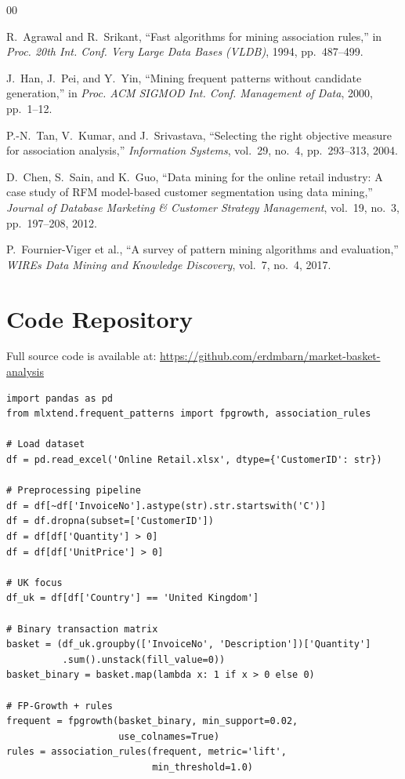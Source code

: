 \documentclass[conference]{IEEEtran}
\begin{document}
\begin{thebibliography}{00}

 R.~Agrawal and R.~Srikant, ``Fast algorithms for mining association rules,'' in \textit{Proc. 20th Int. Conf. Very Large Data Bases (VLDB)}, 1994, pp.~487--499.

 J.~Han, J.~Pei, and Y.~Yin, ``Mining frequent patterns without candidate generation,'' in \textit{Proc. ACM SIGMOD Int. Conf. Management of Data}, 2000, pp.~1--12.

 P.-N.~Tan, V.~Kumar, and J.~Srivastava, ``Selecting the right objective measure for association analysis,'' \textit{Information Systems}, vol.~29, no.~4, pp.~293--313, 2004.

 D.~Chen, S.~Sain, and K.~Guo, ``Data mining for the online retail industry: A case study of RFM model-based customer segmentation using data mining,'' \textit{Journal of Database Marketing \& Customer Strategy Management}, vol.~19, no.~3, pp.~197--208, 2012.

 P.~Fournier-Viger et al., ``A survey of pattern mining algorithms and evaluation,'' \textit{WIREs Data Mining and Knowledge Discovery}, vol.~7, no.~4, 2017.

\end{thebibliography}

\newpage
\onecolumn
\appendix

\section{Code Repository}
\label{app:code}

Full source code is available at: \url{https://github.com/erdmbarn/market-basket-analysis}

\begin{lstlisting}[caption={Preprocessing and Transaction Matrix Construction}, label={lst:preprocess}]
import pandas as pd
from mlxtend.frequent_patterns import fpgrowth, association_rules

# Load dataset
df = pd.read_excel('Online Retail.xlsx', dtype={'CustomerID': str})

# Preprocessing pipeline
df = df[~df['InvoiceNo'].astype(str).str.startswith('C')]
df = df.dropna(subset=['CustomerID'])
df = df[df['Quantity'] > 0]
df = df[df['UnitPrice'] > 0]

# UK focus
df_uk = df[df['Country'] == 'United Kingdom']

# Binary transaction matrix
basket = (df_uk.groupby(['InvoiceNo', 'Description'])['Quantity']
          .sum().unstack(fill_value=0))
basket_binary = basket.map(lambda x: 1 if x > 0 else 0)

# FP-Growth + rules
frequent = fpgrowth(basket_binary, min_support=0.02,
                    use_colnames=True)
rules = association_rules(frequent, metric='lift',
                          min_threshold=1.0)
\end{lstlisting}
\end{document}
